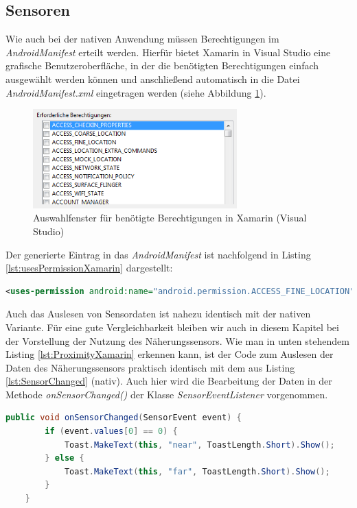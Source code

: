 \subsection*{Sensoren}

Wie auch bei der nativen Anwendung müssen Berechtigungen im \textit{AndroidManifest} erteilt werden. Hierfür bietet Xamarin in Visual Studio eine grafische Benutzeroberfläche, in der die benötigten Berechtigungen einfach ausgewählt werden können und anschließend automatisch in die Datei \textit{AndroidManifest.xml} eingetragen werden (siehe Abbildung \ref{fig:PermissionsAuswXamarin}). 

\begin{figure}[h]
	\centering
	\includegraphics[width=0.7\textwidth]{Bilder/Permissions_Xamarin.PNG}
	\caption{Auswahlfenster für benötigte Berechtigungen in Xamarin (Visual Studio)}
	\label{fig:PermissionsAuswXamarin}
\end{figure}

Der generierte Eintrag in das \textit{AndroidManifest} ist nachfolgend in Listing \ref{lst:usesPermissionXamarin} dargestellt:

\begin{lstlisting}[caption=Erlaubnis für die Nutzung eines Dienstes im \textit{AndroidManifest} (Xamarin), label=lst:usesPermissionXamarin, language=XML]
<uses-permission android:name="android.permission.ACCESS_FINE_LOCATION" />
\end{lstlisting}

Auch das Auslesen von Sensordaten ist nahezu identisch mit der nativen Variante. Für eine gute Vergleichbarkeit bleiben wir auch in diesem Kapitel bei der Vorstellung der Nutzung des Näherungssensors. Wie man in unten stehendem Listing \ref{lst:ProximityXamarin} erkennen kann, ist der Code zum Auslesen der Daten des Näherungssensors praktisch identisch mit dem aus Listing \ref{lst:SensorChanged} (nativ). Auch hier wird die Bearbeitung der Daten in der Methode \textit{onSensorChanged()} der Klasse \textit{SensorEventListener} vorgenommen.

\begin{lstlisting}[caption=Auslesen der Daten des Näherungssensors (Xamarin), label=lst:ProximityXamarin, language=Java]
public void onSensorChanged(SensorEvent event) {
        if (event.values[0] == 0) {
            Toast.MakeText(this, "near", ToastLength.Short).Show();
        } else {
            Toast.MakeText(this, "far", ToastLength.Short).Show();
        }
    }
\end{lstlisting}

